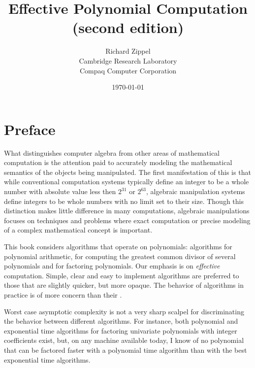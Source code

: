 
\title{Effective Polynomial Computation \\ (second edition)}
\author{Richard Zippel \\ Cambridge Research Laboratory \\ Compaq
  Computer Corporation}

\date{\today}

\maketitle

\setcounter{page}{5}

\cleardoublepage

\tableofcontents

\makeatletter\chapter*{Preface}
\makeatother

What distinguishes computer algebra from other areas of mathematical
computation is the attention paid to accurately modeling the
mathematical semantics of the objects being manipulated.  The first
manifestation of this is that while conventional computation systems
typically define an integer to be a whole number with absolute value
less then $2^{31}$ or $2^{63}$, algebraic manipulation systems define
integers to be whole numbers with no limit set to their size.  Though
this distinction makes little difference in many computations,
algebraic manipulations focuses on techniques and problems where exact
computation or precise modeling of a complex mathematical concept is
important.

This book considers algorithms that operate on polynomials: algorithms
for polynomial arithmetic, for computing the greatest common divisor
of several polynomials and for factoring polynomials.  Our emphasis is
on {\em effective} computation.  Simple, clear and easy to implement
algorithms are preferred to those that are slightly quicker, but more
opaque.  The behavior of algorithms in practice is of more concern
than their .

Worst case asymptotic complexity is not a very sharp scalpel for
discriminating the behavior between different algorithms.  For
instance, both polynomial and exponential time algorithms for
factoring univariate polynomials with integer coefficients exist, but,
on any machine available today, I know of no polynomial that can be
factored faster with a polynomial time algorithm than with the best
exponential time algorithms.

